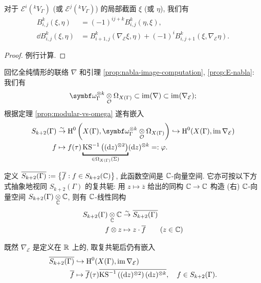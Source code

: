 \begin{lemma}\label{prop:Bkij-property}
	对于 $\mathcal{E}^i({}^k V_\Gamma)$ (或 $\mathcal{E}^j({}^k V_\Gamma)$) 的局部截面 $\xi$ (或 $\eta$), 我们有
	\begin{align*}
		B^k_{i,j}(\xi, \eta) & = (-1)^{ij + k} B^k_{i,j}(\eta, \xi), \\
		\dd B^k_{i,j}(\xi, \eta) & = B^k_{i+1, j}(\nabla_{\mathcal{E}} \xi, \eta) + (-1)^i B^k_{i, j+1}(\xi, \nabla_{\mathcal{E}}\eta).
	\end{align*}
\end{lemma}
\begin{proof}
	例行计算.
\end{proof}

回忆全纯情形的联络 $\nabla$ 和引理 \ref{prop:nabla-image-computation}, \ref{prop:E-nabla}: 我们有
\[ \bomega_\Gamma^{\otimes k} \dotimes{\mathcal{O}} \Omega_{X(\Gamma)} \subset \Image(\nabla) \subset \Image(\nabla_{\mathcal{E}}); \]
根据定理 \ref{prop:modular-vs-omega} 遂有嵌入
\begin{align*}
	S_{k+2}(\Gamma) & \rightiso \Hm^0\left(X(\Gamma), \bomega_\Gamma^{\otimes k} \dotimes{\mathcal{O}} \Omega_{X(\Gamma)}\right) \hookrightarrow \Hm^0(X(\Gamma), \Image \nabla_{\mathcal{E}}) \\
	f & \mapsto f(\tau) \underbracket{\mathrm{KS}^{-1}\left((\dd z)^{\otimes 2}\right)}_{\in \Omega_{X(\Gamma)}(\Sigma)} (\dd z)^{\otimes k} =: \varphi.
\end{align*}

\begin{convention}\label{conv:S-conj}
	定义 $\overline{S_{k+2}(\Gamma)} := \left\{ \overline{f}: f \in S_{k+2}(\mathbb{C}) \right\}$, 此函数空间是 $\mathbb{C}$-向量空间. 它亦可按以下方式抽象地视同 $S_{k+2}(\Gamma)$ 的复共轭: 用 $z \mapsto \overline{z}$ 给出的同构 $\mathbb{C} \to \mathbb{C}$ 构造 (右) $\mathbb{C}$-向量空间 $S_{k+2}(\Gamma) \underset{\mathbb{C}}{\otimes} \mathbb{C}$, 则有 $\mathbb{C}$-线性同构
	\begin{align*}
		S_{k+2}(\Gamma) \underset{\mathbb{C}}{\otimes} \mathbb{C} & \stackrel{\sim}{\rightarrow} \overline{S_{k+2}(\Gamma)} \\
		f \otimes z & \mapsto z \cdot \overline{f} \qquad (z \in \mathbb{C})
	\end{align*}
\end{convention}

既然 $\nabla_{\mathcal{E}}$ 是定义在 $\mathbb{R}$ 上的, 取复共轭后仍有嵌入
\begin{align*}
	\overline{S_{k+2}(\Gamma)} & \hookrightarrow \operatorname{H}^0(X(\Gamma), \operatorname{im} \nabla_{\mathcal{E}}) \\
	\overline{f} & \mapsto \overline{f}(\tau) \overline{\mathrm{KS}^{-1}\left((\mathop{}\!\mathrm{d} z)^{\otimes 2}\right) (\mathop{}\!\mathrm{d} z)^{\otimes k}}, \quad f \in S_{k+2}(\Gamma).
\end{align*}

